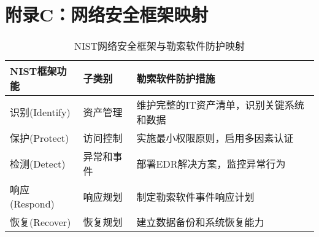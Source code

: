 \documentclass[12pt,a4paper]{article}
\begin{document}
\section{附录C：网络安全框架映射}

\begin{table}[h]
\centering
\small
\begin{tabular}{|p{3cm}|p{4cm}|p{6cm}|}
\hline
\textbf{NIST框架功能} & \textbf{子类别} & \textbf{勒索软件防护措施} \\
\hline
识别(Identify) & 资产管理 & 维护完整的IT资产清单，识别关键系统和数据 \\
\hline
保护(Protect) & 访问控制 & 实施最小权限原则，启用多因素认证 \\
\hline
检测(Detect) & 异常和事件 & 部署EDR解决方案，监控异常行为 \\
\hline
响应(Respond) & 响应规划 & 制定勒索软件事件响应计划 \\
\hline
恢复(Recover) & 恢复规划 & 建立数据备份和系统恢复能力 \\
\hline
\end{tabular}
\caption{NIST网络安全框架与勒索软件防护映射}
\end{table}
\end{document}
